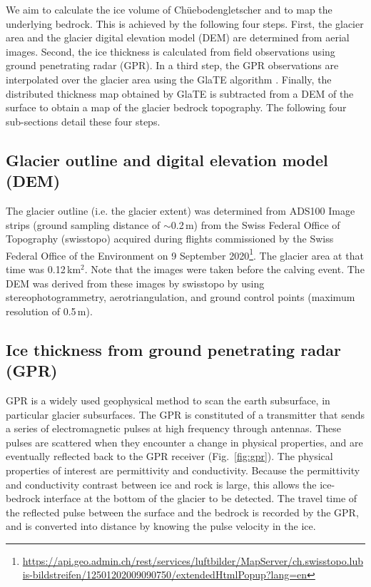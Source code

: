 We aim to calculate the ice volume of Chüebodengletscher and to map the underlying bedrock. This is achieved by the following four steps. First, the glacier area and the glacier digital elevation model (DEM) are determined from aerial images. Second, the ice thickness is calculated from field observations using ground penetrating radar (GPR). In a third step, the GPR observations are interpolated over the glacier area using the GlaTE algorithm \citep{Langhammer&al2019}. Finally, the distributed thickness map obtained by GlaTE is subtracted from a DEM of the surface to obtain a map of the glacier bedrock topography. The following four sub-sections detail these four steps.

\subsection{Glacier outline and digital elevation model (DEM)}
\label{subsection:glacierarea}

The glacier outline (i.e. the glacier extent) was determined from ADS100 Image strips (ground sampling distance of $\sim$0.2\,m) from the Swiss Federal Office of Topography (swisstopo) acquired during flights commissioned by the Swiss Federal Office of the Environment on 9 September 2020\footnote{\url{https://api.geo.admin.ch/rest/services/luftbilder/MapServer/ch.swisstopo.lubis-bildstreifen/12501202009090750/extendedHtmlPopup?lang=en}}. The glacier area at that time was 0.12\,km$^2$. Note that the images were taken before the calving event. The DEM was derived from these images by swisstopo by using stereophotogrammetry, aerotriangulation, and ground control points (maximum resolution of 0.5\,m).

\subsection{Ice thickness from ground penetrating radar (GPR)}

GPR is a widely used geophysical method to scan the earth subsurface, in particular glacier subsurfaces. The GPR is constituted of a transmitter that sends a series of electromagnetic pulses at high frequency through antennas. These pulses are scattered when they encounter a change in physical properties, and are eventually reflected back to the GPR receiver (Fig.~\ref{fig:gpr}). The physical properties of interest are permittivity and conductivity. Because the permittivity and conductivity contrast between ice and rock is large, this allows the ice-bedrock interface at the bottom of the glacier to be detected. The travel time of the reflected pulse between the surface and the bedrock is recorded by the GPR, and is converted into distance by knowing the pulse velocity in the ice. 

